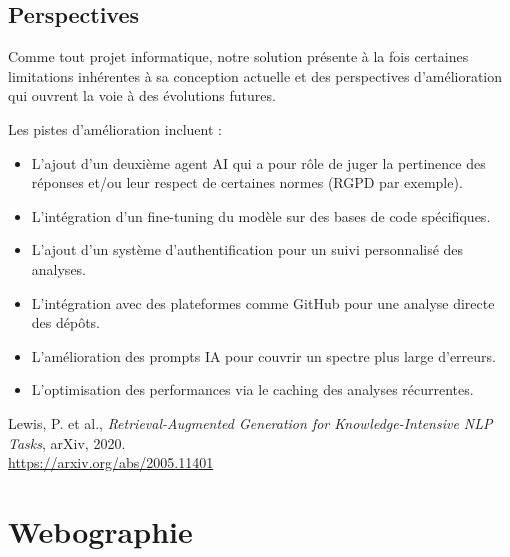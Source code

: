 \documentclass[12pt,a4paper]{report}
\begin{document}
	\section*{Perspectives}
	
	Comme tout projet informatique, notre solution présente à la fois certaines limitations inhérentes à sa conception actuelle et des perspectives d'amélioration qui ouvrent la voie à des évolutions futures.
	
	Les pistes d'amélioration incluent :
	
	\begin{itemize}
		
		\item L'ajout d'un deuxième agent AI qui a pour rôle de juger la pertinence des réponses et/ou leur respect de certaines normes (RGPD par exemple).
		
		\item L’intégration d’un fine-tuning du modèle sur des bases de code spécifiques.
		
		\item L'ajout d'un système d'authentification pour un suivi personnalisé des analyses.
		
		\item  L'intégration avec des plateformes comme GitHub pour une analyse directe des dépôts. 
		
		\item L'amélioration des prompts IA pour couvrir un spectre plus large d'erreurs.
	
		\item L'optimisation des performances via le caching des analyses récurrentes.
		
	\end{itemize}
	
	\clearpage
	
	\begin{thebibliography}{9}
		
		Lewis, P. et al., \emph{Retrieval-Augmented Generation for Knowledge-Intensive NLP Tasks}, arXiv, 2020.\\
		\url{https://arxiv.org/abs/2005.11401}
		
	\end{thebibliography}
	
	\chapter*{Webographie}
	
\end{document}
